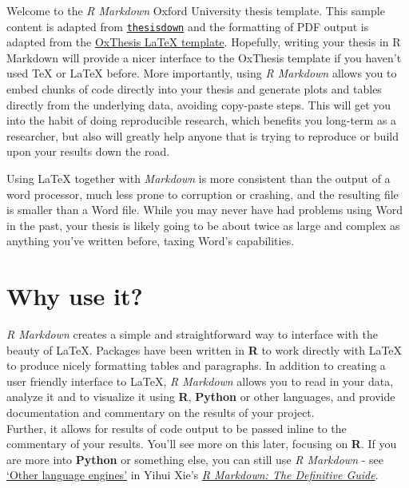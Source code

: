 \documentclass[a4paper, twoside]{templates/ociamthesis}
\begin{document}
\adjustmtc

Welcome to the \emph{R Markdown} Oxford University thesis template.
This sample content is adapted from \href{https://github.com/ismayc/thesisdown}{\texttt{thesisdown}} and the formatting of PDF output is adapted from the \href{https://github.com/mcmanigle/OxThesis}{OxThesis LaTeX template}.
Hopefully, writing your thesis in R Markdown will provide a nicer interface to the OxThesis template if you haven't used TeX or LaTeX before.
More importantly, using \emph{R Markdown} allows you to embed chunks of code directly into your thesis and generate plots and tables directly from the underlying data, avoiding copy-paste steps.
This will get you into the habit of doing reproducible research, which benefits you long-term as a researcher, but also will greatly help anyone that is trying to reproduce or build upon your results down the road.

Using LaTeX together with \emph{Markdown} is more consistent than the output of a word processor, much less prone to corruption or crashing, and the resulting file is smaller than a Word file.
While you may never have had problems using Word in the past, your thesis is likely going to be about twice as large and complex as anything you've written before, taxing Word's capabilities.

\hypertarget{why-use-it}{%
\section*{Why use it?}\label{why-use-it}}

\emph{R Markdown} creates a simple and straightforward way to interface with the beauty of LaTeX.
Packages have been written in \textbf{R} to work directly with LaTeX to produce nicely formatting tables and paragraphs.
In addition to creating a user friendly interface to LaTeX, \emph{R Markdown} allows you to read in your data, analyze it and to visualize it using \textbf{R}, \textbf{Python} or other languages, and provide documentation and commentary on the results of your project.\\
Further, it allows for results of code output to be passed inline to the commentary of your results.
You'll see more on this later, focusing on \textbf{R}. If you are more into \textbf{Python} or something else, you can still use \emph{R Markdown} - see \href{https://bookdown.org/yihui/rmarkdown/language-engines.html}{`Other language engines'} in Yihui Xie's \href{https://bookdown.org/yihui/rmarkdown/language-engines.html}{\emph{R Markdown: The Definitive Guide}}.
\end{document}
